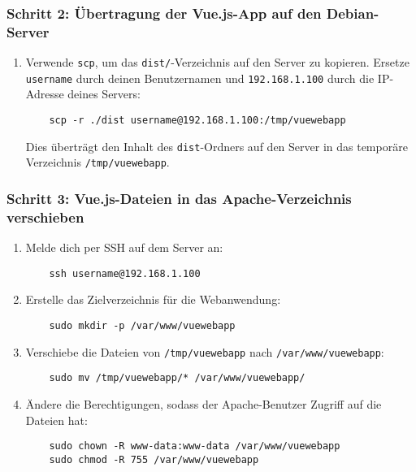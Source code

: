 \documentclass[a4paper,12pt]{article}
\begin{document}
\subsubsection{Schritt 2: Übertragung der Vue.js-App auf den Debian-Server}
\begin{enumerate}
    \item Verwende \texttt{scp}, um das \texttt{dist/}-Verzeichnis auf den Server zu kopieren. Ersetze \texttt{username} durch deinen Benutzernamen und \texttt{192.168.1.100} durch die IP-Adresse deines Servers:
    
    \begin{lstlisting}
    scp -r ./dist username@192.168.1.100:/tmp/vuewebapp
    \end{lstlisting}
    
    Dies überträgt den Inhalt des \texttt{dist}-Ordners auf den Server in das temporäre Verzeichnis \texttt{/tmp/vuewebapp}.
\end{enumerate}

\subsubsection{Schritt 3: Vue.js-Dateien in das Apache-Verzeichnis verschieben}
\begin{enumerate}
    \item Melde dich per SSH auf dem Server an:

    \begin{lstlisting}
    ssh username@192.168.1.100
    \end{lstlisting}
    
    \item Erstelle das Zielverzeichnis für die Webanwendung:
    
    \begin{lstlisting}
    sudo mkdir -p /var/www/vuewebapp
    \end{lstlisting}
    
    \item Verschiebe die Dateien von \texttt{/tmp/vuewebapp} nach \texttt{/var/www/vuewebapp}:
    
    \begin{lstlisting}
    sudo mv /tmp/vuewebapp/* /var/www/vuewebapp/
    \end{lstlisting}
    
    \item Ändere die Berechtigungen, sodass der Apache-Benutzer Zugriff auf die Dateien hat:
    
    \begin{lstlisting}
    sudo chown -R www-data:www-data /var/www/vuewebapp
    sudo chmod -R 755 /var/www/vuewebapp
    \end{lstlisting}
\end{enumerate}
\end{document}

